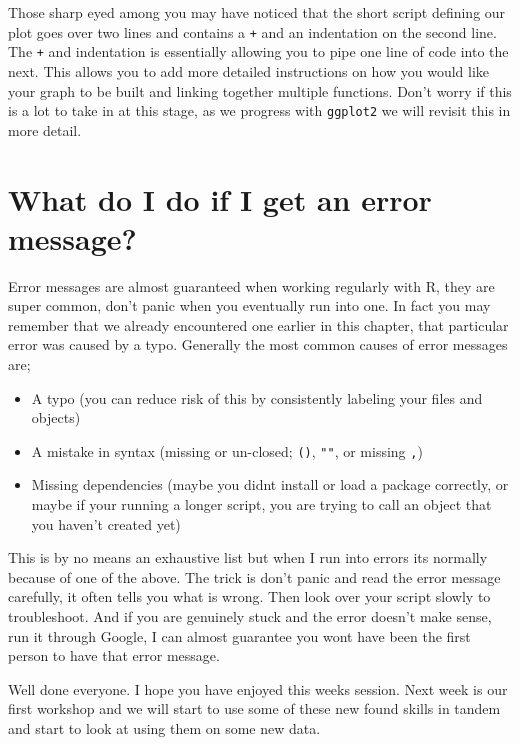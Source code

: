 \documentclass[
]{book}
\providecommand{\tightlist}{%
  \setlength{\itemsep}{0pt}\setlength{\parskip}{0pt}}
\begin{document}
Those sharp eyed among you may have noticed that the short script defining our plot goes over two lines and contains a \texttt{+} and an indentation on the second line. The \texttt{+} and indentation is essentially allowing you to pipe one line of code into the next. This allows you to add more detailed instructions on how you would like your graph to be built and linking together multiple functions. Don't worry if this is a lot to take in at this stage, as we progress with \texttt{ggplot2} we will revisit this in more detail.

\section{What do I do if I get an error message?}\label{what-do-i-do-if-i-get-an-error-message}

Error messages are almost guaranteed when working regularly with R, they are super common, don't panic when you eventually run into one. In fact you may remember that we already encountered one earlier in this chapter, that particular error was caused by a typo. Generally the most common causes of error messages are;

\begin{itemize}
\tightlist
\item
  A typo (you can reduce risk of this by consistently labeling your files and objects)
\item
  A mistake in syntax (missing or un-closed; \texttt{()}, \texttt{""}, or missing \texttt{,})
\item
  Missing dependencies (maybe you didnt install or load a package correctly, or maybe if your running a longer script, you are trying to call an object that you haven't created yet)
\end{itemize}

This is by no means an exhaustive list but when I run into errors its normally because of one of the above. The trick is don't panic and read the error message carefully, it often tells you what is wrong. Then look over your script slowly to troubleshoot. And if you are genuinely stuck and the error doesn't make sense, run it through Google, I can almost guarantee you wont have been the first person to have that error message.

Well done everyone. I hope you have enjoyed this weeks session. Next week is our first workshop and we will start to use some of these new found skills in tandem and start to look at using them on some new data.
\end{document}
